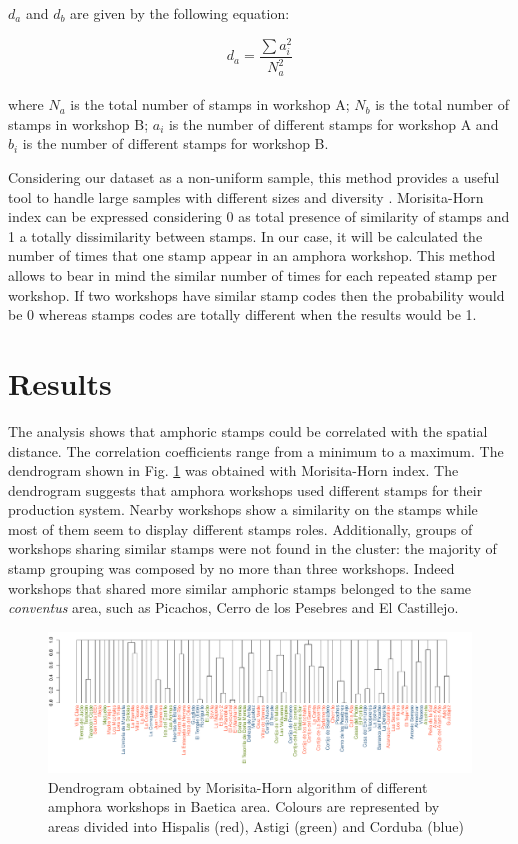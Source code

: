 \documentclass[review]{elsarticle}
\begin{document}
$d_{a}$ and $d_{b}$ are given by the following equation:

\begin{equation}
d_{a} = \frac{\sum a_{i}^{2}}{N_{a}^{2}} 
\end{equation} \\

where $N_{a}$ is the total number of stamps in workshop A; $N_{b}$ is the total number of stamps in workshop B; $a_{i}$ is the number of different stamps for workshop A and $b_{i}$ is the number of different stamps for workshop B.

Considering our dataset as a non-uniform sample, this method provides a useful tool to handle large samples with different sizes and diversity \citep{wolda_similarity_1981}. Morisita-Horn index can be expressed considering 0 as total presence of similarity of stamps and 1 a totally dissimilarity between stamps. In our case, it will be calculated the number of times that one stamp appear in an amphora workshop. This method allows to bear in mind the similar number of times for each repeated stamp per workshop. If two workshops have similar stamp codes then the probability would be 0 whereas stamps codes are totally different when the results would be 1. 


\section{Results}

The analysis shows that amphoric stamps could be correlated with the spatial distance. The correlation coefficients range from a minimum to a maximum. The dendrogram shown in Fig. \ref{dendro} was obtained with Morisita-Horn index. The dendrogram suggests that amphora workshops used different stamps for their production system. Nearby workshops show a similarity on the stamps while most of them seem to display different stamps roles. Additionally, groups of workshops sharing similar stamps were not found in the cluster: the majority of stamp grouping was composed by no more than three workshops. Indeed workshops that shared more similar amphoric stamps belonged to the same \textit{conventus} area, such as Picachos, Cerro de los Pesebres and El Castillejo. 

\begin{figure}[htp]
	\centering
\includegraphics[width=\linewidth]{figs/dendro}
\caption{Dendrogram obtained by Morisita-Horn algorithm of different amphora workshops in Baetica area. Colours are represented by areas divided into Hispalis (red), Astigi (green) and Corduba (blue)}
\label{dendro}
\end{figure} 
\end{document}
